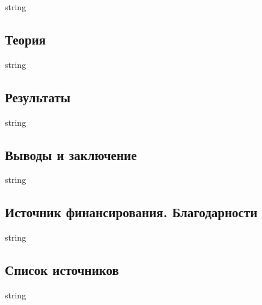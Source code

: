 \documentclass{article}%
\begin{document}
%
string%
\subsection*{Теория}%
\label{subsec:}%

%
string%
\subsection*{Результаты}%
\label{subsec:}%

%
string%
\subsection*{Выводы и заключение}%
\label{subsec:}%

%
string%
\subsection*{Источник финансирования. Благодарности}%
\label{subsec:.}%

%
string%
\subsection*{Список источников}%
\label{subsec:}%

%
string%
\end{document}
